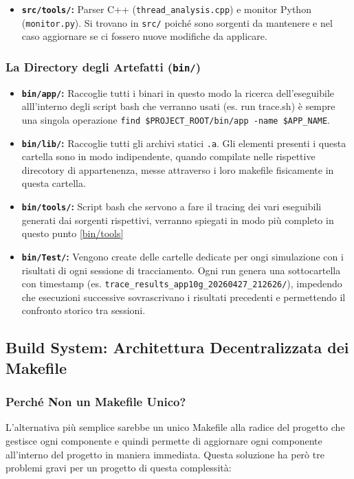 \begin{itemize}
	\item \textbf{\texttt{src/tools/}:} Parser C++ (\texttt{thread\_analysis.cpp}) e monitor Python (\texttt{monitor.py}). Si trovano in \texttt{src/} poiché sono sorgenti da mantenere e nel caso aggiornare se ci fossero nuove modifiche da applicare.
\end{itemize}

\subsubsection{La Directory degli Artefatti (\texttt{bin/})}

\begin{itemize}
	\item \textbf{\texttt{bin/app/}:} Raccoglie tutti i binari in questo modo la ricerca dell'eseguibile alll'interno degli script bash che verranno usati (es. run trace.sh) 
	è sempre una singola operazione \texttt{find \$PROJECT\_ROOT/bin/app -name \$APP\_NAME}.
	\item \textbf{\texttt{bin/lib/}:} Raccoglie tutti gli archivi statici \texttt{.a}. Gli elementi presenti i questa cartella sono in modo  indipendente, quando compilate nelle rispettive direcotory di appartenenza, messe attraverso i loro makefile fisicamente in questa cartella.
	\item \textbf{\texttt{bin/tools/}:} Script bash che servono a fare il tracing dei vari eseguibili generati dai sorgenti rispettivi, verranno spiegati in modo più completo in questo punto \ref{bin/tools}
	\item \textbf{\texttt{bin/Test/}:} Vengono create delle cartelle dedicate per ongi simulazione con i risultati di ogni sessione di tracciamento. Ogni run genera una sottocartella con timestamp (es. \texttt{trace\_results\_app10g\_20260427\_212626/}), impedendo che esecuzioni successive sovrascrivano i risultati precedenti e permettendo il confronto storico tra sessioni.
\end{itemize}

\subsection{Build System: Architettura Decentralizzata dei Makefile}

\subsubsection{Perché Non un Makefile Unico?}

L'alternativa più semplice sarebbe un unico Makefile alla radice del progetto che gestisce ogni componente e quindi permette di aggiornare ogni componente all'interno del progetto in maniera immediata. Questa soluzione ha però tre problemi gravi per un progetto di questa complessità:

